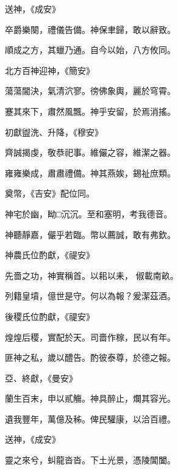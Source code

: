 \begin{pinyinscope}
 送神，《成安》



 卒爵樂闋，禮儀告備。神保聿歸，敢以辭致。



 順成之方，其蠟乃通。自今以始，八方攸同。



 北方百神迎神，《簡安》



 蕩蕩閫決，氣清泬寥。徬佛象輿，麗於穹霄。



 蹇其來下，肅然風飄。神乎安留，於焉消搖。



 初獻盥洗、升降，《穆安》



 齊誠揭虔，敬恭祀事。維儼之容，維潔之器。



 雍雍樂成，肅肅禮備。神其燕娭，錫祉庶類。



 奠幣，《吉安》配位同。



 神宅於幽，眑□沉沉。至和塞明，考我德音。



 神聽靜嘉，儼乎若臨。幣以薦誠，敢有弗欽。



 神農氏位酌獻，《禔安》



 先嗇之功，神實稱首。以耜以耒，
 俶載南畝。



 列籍皇墳，億世是守。何以為報？爰潔茲酒。



 後稷氏位酌獻，《禔安》



 煌煌后稷，實配於天。司嗇作稼，民以有年。



 匪神之私，歲以醴告。酌彼泰尊，於德之報。



 亞、終獻，《曼安》



 蘭生百末，申以貳觴。神具醉止，爛其容光。



 遺我豐年，萬億及秭。俾民驩康，以洽百禮。



 送神，《成安》



 靈之來兮，虯龍沓沓。下土光景，憑陵閶闔。




\end{pinyinscope}
